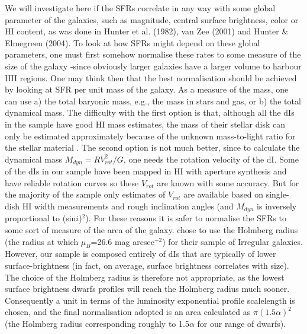 \documentclass[preprint]{aastex}
\begin{document}
We will investigate here if the SFRs correlate in any way with some
global parameter of the galaxies, such as magnitude, central surface brightness,
color or HI content, as was done in Hunter et al. (1982), van Zee (2001) and 
Hunter \& Elmegreen (2004). 
To look at how SFRs might depend on these global
parameters, one must first somehow normalise these rates to some
measure of the size of the galaxy -since obviously larger galaxies
have a larger volume to harbour HII regions. One may think then that
the best normalisation should be achieved by looking at SFR per unit
mass of the galaxy. As a measure of the mass, one can use a) the
total baryonic mass, e.g., the mass in stars and gas, or b) the total
dynamical mass. The difficulty with the first option is that, although
all the dIs in the sample have good HI mass estimates, the mass of 
their stellar disk can only be estimated approximately because of
the unknown mass-to-light ratio for the stellar material \citep[at best, some
estimates could be obtained using the color indexes of the galaxies, e.g.,]
[]{lea06}.
The second option is not much better, since to calculate the dynamical
mass $M_{dyn} = R V_{rot}^2/G$, one needs the rotation velocity of the
dI. Some of the dIs in our sample have been mapped in HI with aperture 
synthesis and have reliable rotation curves so these $V_{rot}$ are known
with some accuracy. But for the majority of the sample only estimates
of $V_{rot}$ are available based on single-dish HI width measurements 
and rough inclination angles (and $M_{dyn}$ is inversely proportional to
(sin$i$)$^2$). For these reasons it is safer to normalise the SFRs
to some sort of measure of the area of the galaxy.
\citet{hg86} chose to use the Holmberg radius 
(the radius at which $\mu _B$=26.6 mag arcsec$^{-2}$) 
for their sample of Irregular galaxies. However, our sample is 
composed entirely of dIs that are typically of lower surface-brightness 
(in fact, on average, surface brightness correlates with size).
The choice of the Holmberg radius
is therefore not appropriate, as the lowest surface brightness dwarfs
profiles will reach the Holmberg radius 
much sooner. Consequently a unit in terms of the
luminosity exponential profile scalelength is chosen, and the final 
normalisation adopted is an area calculated as $\pi (1.5 \alpha)^2$
(the Holmberg radius corresponding roughly to 1.5$\alpha$ 
for our range of dwarfs). 
\end{document}
